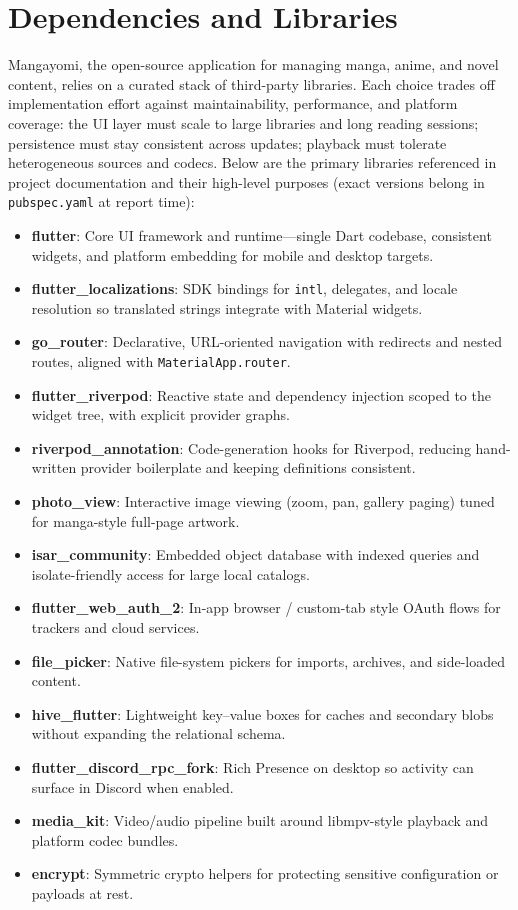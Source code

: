 
\section{Dependencies and Libraries}

Mangayomi, the open-source application for managing manga, anime, and novel content, relies on a curated stack of third-party libraries. Each choice trades off implementation effort against maintainability, performance, and platform coverage: the UI layer must scale to large libraries and long reading sessions; persistence must stay consistent across updates; playback must tolerate heterogeneous sources and codecs. Below are the primary libraries referenced in project documentation and their high-level purposes (exact versions belong in \texttt{pubspec.yaml} at report time):

\begin{itemize}
    \item \textbf{flutter}: Core UI framework and runtime---single Dart codebase, consistent widgets, and platform embedding for mobile and desktop targets.
    \item \textbf{flutter\_localizations}: SDK bindings for \texttt{intl}, delegates, and locale resolution so translated strings integrate with Material widgets.
    \item \textbf{go\_router}: Declarative, URL-oriented navigation with redirects and nested routes, aligned with \texttt{MaterialApp.router}.
    \item \textbf{flutter\_riverpod}: Reactive state and dependency injection scoped to the widget tree, with explicit provider graphs.
    \item \textbf{riverpod\_annotation}: Code-generation hooks for Riverpod, reducing hand-written provider boilerplate and keeping definitions consistent.
    \item \textbf{photo\_view}: Interactive image viewing (zoom, pan, gallery paging) tuned for manga-style full-page artwork.
    \item \textbf{isar\_community}: Embedded object database with indexed queries and isolate-friendly access for large local catalogs.
    \item \textbf{flutter\_web\_auth\_2}: In-app browser / custom-tab style OAuth flows for trackers and cloud services.
    \item \textbf{file\_picker}: Native file-system pickers for imports, archives, and side-loaded content.
    \item \textbf{hive\_flutter}: Lightweight key--value boxes for caches and secondary blobs without expanding the relational schema.
    \item \textbf{flutter\_discord\_rpc\_fork}: Rich Presence on desktop so activity can surface in Discord when enabled.
    \item \textbf{media\_kit}: Video/audio pipeline built around libmpv-style playback and platform codec bundles.
    \item \textbf{encrypt}: Symmetric crypto helpers for protecting sensitive configuration or payloads at rest.
\end{itemize}


